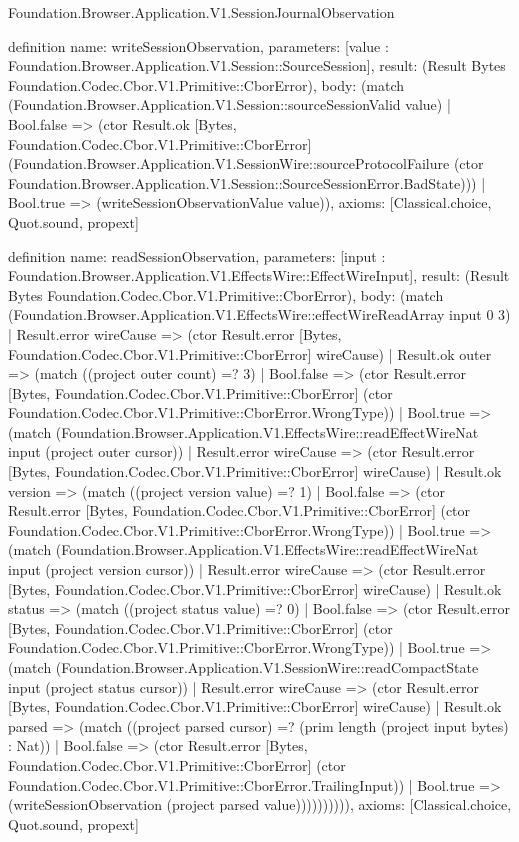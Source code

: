 \begin{lexlean}{Foundation.Browser.Application.V1.SessionJournalObservation}
\begin{semanticmodule}
definition{
  name: writeSessionObservation,
  parameters: [value : Foundation.Browser.Application.V1.Session::SourceSession],
  result: (Result Bytes Foundation.Codec.Cbor.V1.Primitive::CborError),
  body: (match (Foundation.Browser.Application.V1.Session::sourceSessionValid value)
    | Bool.false => (ctor Result.ok [Bytes, Foundation.Codec.Cbor.V1.Primitive::CborError] (Foundation.Browser.Application.V1.SessionWire::sourceProtocolFailure (ctor Foundation.Browser.Application.V1.Session::SourceSessionError.BadState)))
    | Bool.true => (writeSessionObservationValue value)),
  axioms: [Classical.choice, Quot.sound, propext]
}

definition{
  name: readSessionObservation,
  parameters: [input : Foundation.Browser.Application.V1.EffectsWire::EffectWireInput],
  result: (Result Bytes Foundation.Codec.Cbor.V1.Primitive::CborError),
  body: (match (Foundation.Browser.Application.V1.EffectsWire::effectWireReadArray input 0 3)
    | Result.error wireCause => (ctor Result.error [Bytes, Foundation.Codec.Cbor.V1.Primitive::CborError] wireCause)
    | Result.ok outer => (match ((project outer count) =? 3)
      | Bool.false => (ctor Result.error [Bytes, Foundation.Codec.Cbor.V1.Primitive::CborError] (ctor Foundation.Codec.Cbor.V1.Primitive::CborError.WrongType))
      | Bool.true => (match (Foundation.Browser.Application.V1.EffectsWire::readEffectWireNat input (project outer cursor))
        | Result.error wireCause => (ctor Result.error [Bytes, Foundation.Codec.Cbor.V1.Primitive::CborError] wireCause)
        | Result.ok version => (match ((project version value) =? 1)
          | Bool.false => (ctor Result.error [Bytes, Foundation.Codec.Cbor.V1.Primitive::CborError] (ctor Foundation.Codec.Cbor.V1.Primitive::CborError.WrongType))
          | Bool.true => (match (Foundation.Browser.Application.V1.EffectsWire::readEffectWireNat input (project version cursor))
            | Result.error wireCause => (ctor Result.error [Bytes, Foundation.Codec.Cbor.V1.Primitive::CborError] wireCause)
            | Result.ok status => (match ((project status value) =? 0)
              | Bool.false => (ctor Result.error [Bytes, Foundation.Codec.Cbor.V1.Primitive::CborError] (ctor Foundation.Codec.Cbor.V1.Primitive::CborError.WrongType))
              | Bool.true => (match (Foundation.Browser.Application.V1.SessionWire::readCompactState input (project status cursor))
                | Result.error wireCause => (ctor Result.error [Bytes, Foundation.Codec.Cbor.V1.Primitive::CborError] wireCause)
                | Result.ok parsed => (match ((project parsed cursor) =? (prim length (project input bytes) : Nat))
                  | Bool.false => (ctor Result.error [Bytes, Foundation.Codec.Cbor.V1.Primitive::CborError] (ctor Foundation.Codec.Cbor.V1.Primitive::CborError.TrailingInput))
                  | Bool.true => (writeSessionObservation (project parsed value)))))))))),
  axioms: [Classical.choice, Quot.sound, propext]
}


\end{semanticmodule}
\end{lexlean}
